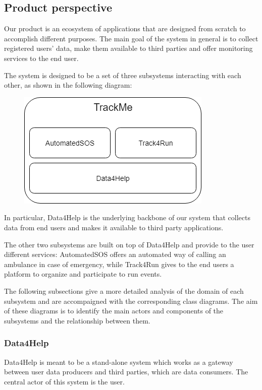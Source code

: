 \subsection{Product perspective}
Our product is an ecosystem of applications that are designed from scratch to accomplish different purposes.
The main goal of the system in general is to collect registered users' data, make them available to third parties and offer monitoring services to the end user.

The system is designed to be a set of three subsystems interacting with each other, as shown in the following diagram:

\begin{figure}[h!]
	\centering
	\includegraphics[scale = 0.70]{Images/general_structure.png}\\[1.0 cm]
\end{figure}

In particular, Data4Help is the underlying backbone of our system that collects data from end users and makes it available to third party applications. 

The other two subsystems are built on top of Data4Help and provide to the user different services: AutomatedSOS offers an automated way of calling an ambulance in case of emergency, while Track4Run gives to the end users a platform to organize and participate to run events.

The following subsections give a more detailed analysis of the domain of each subsystem and are accompaigned with the corresponding class diagrams. The aim of these diagrams is to identify the main actors and components of the subsystems and the relationship between them.
 
 \newpage
 
\subsubsection{Data4Help}
Data4Help is meant to be a stand-alone system which works as a gateway between user data producers and third parties, which are data consumers. The central actor of this system is the user.

